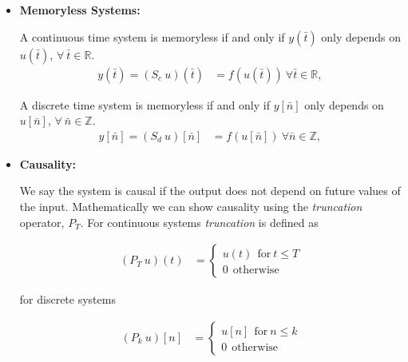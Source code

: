 \documentclass[twoside]{article}
\begin{document}
\begin{itemize}
\vspace{6pt}

\item \textbf{Memoryless Systems:}

\vspace{6pt}

A continuous time system is memoryless if and
only if $y(\bar{t})$ only depends on $u(\bar{t})$, $\forall \ \bar{t} \in \mathbb{R}$.
%
\begin{align*}
y(\bar{t}) = (S_c \ u)  (\bar{t}) &= f(u(\bar{t})) \ \forall \bar{t} \in \mathbb{R}, \
\end{align*}

A discrete time system is memoryless if and
only if $y[\bar{n}]$ only depends on $u[\bar{n}]$, $\forall \ \bar{n}
\in \mathbb{Z}$.
%
\begin{align*}
y[\bar{n}] = (S_d \ u)  [\bar{n}] &= f(u[\bar{n}]) \ \forall \bar{n} \in \mathbb{Z}, \
\end{align*}


\vspace{12pt}

\item \textbf{Causality:}

\vspace{6pt}

We say the system is causal if the output does not depend on future
values of the input. Mathematically we can show causality using the
\textit{truncation} operator, $P_T$. For continuous systems
\textit{truncation} is defined as

\begin{align*}
(P_T \ u ) (t) &= \left\lbrace \begin{array}{c} u(t) \ \ \mathrm{for}
                                  \ t \leq T 
\\ 0 \ \ \mathrm{otherwise} \end{array} \right. 
\end{align*}

for discrete systems

\begin{align*}
(P_k \ u ) [n] &= \left\lbrace \begin{array}{c} u[n] \ \ \mathrm{for}
                                  \ n \leq k \\ 0 \ \ \mathrm{otherwise} \end{array} \right. 
\end{align*}

\vspace{6pt}


\end{itemize}
\end{document}
